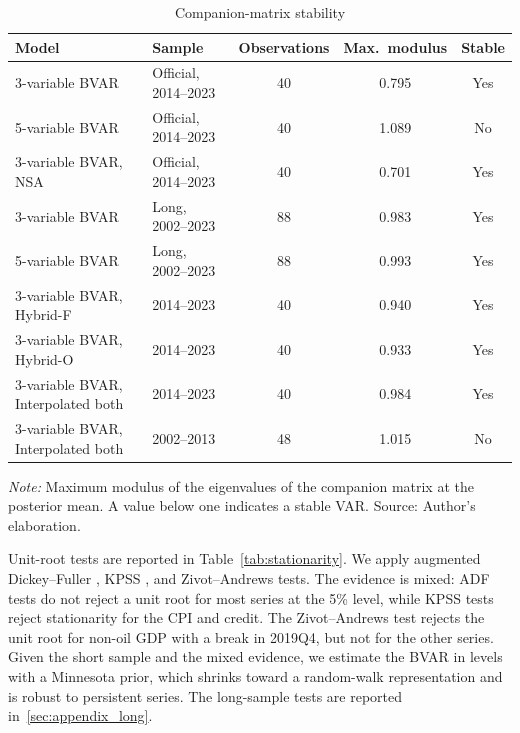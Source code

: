 \documentclass[11pt,a4paper]{article}
\begin{document}
\begin{table}[htbp]
\centering
\small
\caption{Companion-matrix stability}
\label{tab:stability}
\begin{tabular}{@{}llccc@{}}
\toprule
Model & Sample & Observations & Max.\ modulus & Stable \\
\midrule
3-variable BVAR & Official, 2014--2023 & 40 & 0.795 & Yes \\
5-variable BVAR & Official, 2014--2023 & 40 & 1.089 & No \\
3-variable BVAR, NSA & Official, 2014--2023 & 40 & 0.701 & Yes \\
3-variable BVAR & Long, 2002--2023 & 88 & 0.983 & Yes \\
5-variable BVAR & Long, 2002--2023 & 88 & 0.993 & Yes \\
3-variable BVAR, Hybrid-F & 2014--2023 & 40 & 0.940 & Yes \\
3-variable BVAR, Hybrid-O & 2014--2023 & 40 & 0.933 & Yes \\
3-variable BVAR, Interpolated both & 2014--2023 & 40 & 0.984 & Yes \\
3-variable BVAR, Interpolated both & 2002--2013 & 48 & 1.015 & No \\
\bottomrule
\end{tabular}
\par\vspace{0.3em}
\begin{minipage}{0.95\textwidth}
\footnotesize\textit{Note:} Maximum modulus of the eigenvalues of the companion matrix at the posterior mean. A value below one indicates a stable VAR. Source: Author's elaboration.
\end{minipage}
\end{table}

Unit-root tests are reported in Table~\ref{tab:stationarity}. We apply augmented Dickey--Fuller \parencite{dickeyfuller1979}, KPSS \parencite{kpss1992}, and Zivot--Andrews \parencite{zivot1992} tests. The evidence is mixed: ADF tests do not reject a unit root for most series at the 5\% level, while KPSS tests reject stationarity for the CPI and credit. The Zivot--Andrews test rejects the unit root for non-oil GDP with a break in 2019Q4, but not for the other series. Given the short sample and the mixed evidence, we estimate the BVAR in levels with a Minnesota prior, which shrinks toward a random-walk representation and is robust to persistent series. The long-sample tests are reported in~\ref{sec:appendix_long}.
\end{document}
